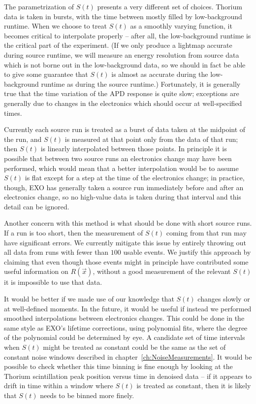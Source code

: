 The parametrization of $S(t)$ presents a very different set of choices.  Thorium data is taken in bursts, with the time between mostly filled by low-background runtime.  When we choose to treat $S(t)$ as a smoothly varying function, it becomes critical to interpolate properly -- after all, the low-background runtime is the critical part of the experiment.  (If we only produce a lightmap accurate during source runtime, we will measure an energy resolution from source data which is not borne out in the low-background data, so we should in fact be able to give some guarantee that $S(t)$ is almost as accurate during the low-background runtime as during the source runtime.)  Fortunately, it is generally true that the time variation of the APD response is quite slow; exceptions are generally due to changes in the electronics which should occur at well-specified times.

Currently each source run is treated as a burst of data taken at the midpoint of the run, and $S(t)$ is measured at that point only from the data of that run; then $S(t)$ is linearly interpolated between those points.  In principle it is possible that between two source runs an electronics change may have been performed, which would mean that a better interpolation would be to assume $S(t)$ is flat except for a step at the time of the electronics change; in practice, though, EXO has generally taken a source run immediately before and after an electronics change, so no high-value data is taken during that interval and this detail can be ignored.

Another concern with this method is what should be done with short source runs.  If a run is too short, then the measurement of $S(t)$ coming from that run may have significant errors.  We currently mitigate this issue by entirely throwing out all data from runs with fewer than $100$ usable events.  We justify this approach by claiming that even though those events might in principle have contributed some useful information on $R(\vec{x})$, without a good measurement of the relevant $S(t)$ it is impossible to use that data.

It would be better if we made use of our knowledge that $S(t)$ changes slowly or at well-defined moments.  In the future, it would be useful if instead we performed smoothed interpolations between electronics changes.  This could be done in the same style as EXO's lifetime corrections, using polynomial fits, where the degree of the polynomial could be determined by eye.  A candidate set of time intervals when $S(t)$ might be treated as constant could be the same as the set of constant noise windows described in chapter~\ref{ch:NoiseMeasurements}.  It would be possible to check whether this time binning is fine enough by looking at the Thorium scintillation peak position versus time in denoised data -- if it appears to drift in time within a window where $S(t)$ is treated as constant, then it is likely that $S(t)$ needs to be binned more finely.

